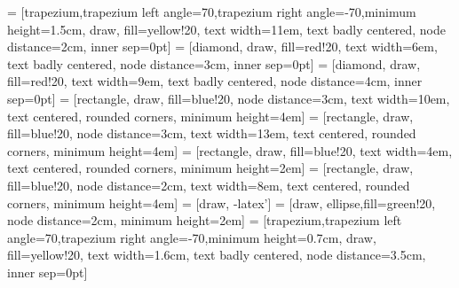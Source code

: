  = [trapezium,trapezium left angle=70,trapezium right angle=-70,minimum height=1.5cm, draw, fill=yellow!20, text width=11em, text badly centered, node distance=2cm, inner sep=0pt]
 = [diamond, draw, fill=red!20, 
    text width=6em, text badly centered, node distance=3cm, inner sep=0pt]
 = [diamond, draw, fill=red!20, 
    text width=9em, text badly centered, node distance=4cm, inner sep=0pt]
 = [rectangle, draw, fill=blue!20, node distance=3cm,
    text width=10em, text centered, rounded corners, minimum height=4em]
 = [rectangle, draw, fill=blue!20, node distance=3cm,
    text width=13em, text centered, rounded corners, minimum height=4em]
     = [rectangle, draw, fill=blue!20, 
    text width=4em, text centered, rounded corners, minimum height=2em]
     = [rectangle, draw, fill=blue!20, node distance=2cm,
    text width=8em, text centered, rounded corners, minimum height=4em]
     = [draw, -latex']
 = [draw, ellipse,fill=green!20, node distance=2cm,
    minimum height=2em]
     = [trapezium,trapezium left angle=70,trapezium right angle=-70,minimum height=0.7cm, draw, fill=yellow!20, text width=1.6cm, text badly centered, node distance=3.5cm, inner sep=0pt]
    
